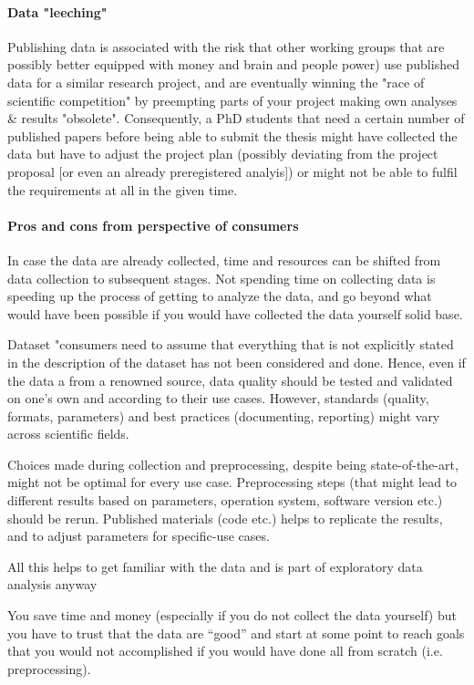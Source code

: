 \paragraph{Data "leeching"}
%
Publishing data is associated with the risk that other working groups that are
possibly better equipped with money and brain and people power) use published
data for a similar research project, and are eventually winning the "race of
scientific competition" by preempting parts of your project making own analyses
\& results "obsolete".
%
Consequently, a PhD students that need a certain number of published papers
before being able to submit the thesis might have collected the data but have to
adjust the project plan (possibly deviating from the project proposal [or even
an already preregistered analyis]) or might not be able to fulfil the
requirements at all in the given time.


\paragraph{Pros and cons from perspective of consumers}
%
In case the data are already collected, time and resources can be shifted from
data collection to subsequent stages.
%
Not spending time on collecting data is speeding up the process of getting to
analyze the data, and go beyond what would have been possible if you would have
collected the data yourself solid base.

Dataset "consumers need to assume that everything that is not explicitly stated
in the description of the dataset has not been considered and done.
%
Hence, even if the data a from a renowned source, data quality should be tested
and validated on one's own and according to their use cases.
%
However, standards (quality, formats, parameters) and best practices
(documenting, reporting) might vary across scientific
fields.


Choices made during collection and preprocessing, despite being
state-of-the-art, might not be optimal for every use case.
%
Preprocessing steps (that might lead to different results based on parameters,
operation system, software version etc.) should be rerun.
%
Published materials (code etc.) helps to replicate the results, and to adjust
parameters for specific-use cases.

%
All this helps to get familiar with the data and is part of exploratory data
analysis anyway


You save time and money (especially if you do not collect the data yourself) but
you have to trust that the data are ``good'' and start at some point to reach
goals that you would not accomplished if you would have done all from scratch
(i.e. preprocessing).

